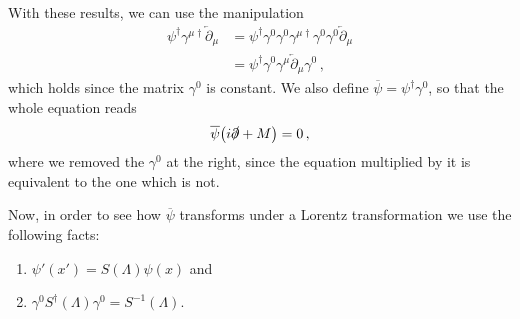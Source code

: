 \documentclass[main.tex]{subfiles}
\begin{document}
With these results, we can use the manipulation 
%
\begin{subequations}
\begin{align}
\psi ^\dag \gamma^{\mu \dag} \overleftarrow{\partial}_{\mu } &= 
\psi ^\dag \gamma^{0} \gamma^{0} \gamma^{\mu \dag} \gamma^{0} \gamma^{0} \overleftarrow{\partial}_{\mu }  \\
&= \psi ^\dag \gamma^{0} \gamma^{\mu } \overleftarrow{\partial}_{\mu } \gamma^{0}
\,,
\end{align}
\end{subequations}
%
which holds since the matrix \(\gamma^{0}\) is constant.
We also define \(\overline{\psi} = \psi ^\dag \gamma^{0}\), so that the whole equation reads 
%
\begin{align}
\overline{\psi} \qty(i \slashed{\partial} + M ) =0 
\,,
\end{align}
%
where we removed the \(\gamma^{0}\) at the right, since the equation multiplied by it is equivalent to the one which is not. 

Now, in order to see how \(\overline{\psi}\) transforms under a Lorentz transformation we use the following facts: 
\begin{enumerate}
  \item \(\psi' (x' ) = S(\Lambda ) \psi (x)\) and 
  \item \(\gamma^{0} S ^\dag (\Lambda ) \gamma^{0} = S^{-1}(\Lambda )\).
\end{enumerate}
\end{document}
